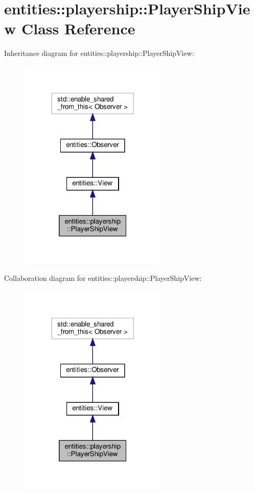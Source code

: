\hypertarget{classentities_1_1playership_1_1PlayerShipView}{}\section{entities\+:\+:playership\+:\+:Player\+Ship\+View Class Reference}
\label{classentities_1_1playership_1_1PlayerShipView}


Inheritance diagram for entities\+:\+:playership\+:\+:Player\+Ship\+View\+:\nopagebreak
\begin{figure}[H]
\begin{center}
\leavevmode
\includegraphics[width=200pt]{classentities_1_1playership_1_1PlayerShipView__inherit__graph}
\end{center}
\end{figure}


Collaboration diagram for entities\+:\+:playership\+:\+:Player\+Ship\+View\+:\nopagebreak
\begin{figure}[H]
\begin{center}
\leavevmode
\includegraphics[width=200pt]{classentities_1_1playership_1_1PlayerShipView__coll__graph}
\end{center}
\end{figure}
